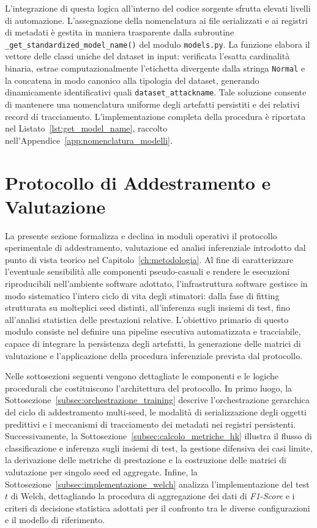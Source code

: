 L'integrazione di questa logica all'interno del codice sorgente sfrutta elevati livelli di automazione. 
L'assegnazione della nomenclatura ai file serializzati e ai registri di metadati è gestita in maniera trasparente dalla subroutine \texttt{\_get\_standardized\_model\_name()} del modulo \texttt{models.py}. 
La funzione elabora il vettore delle classi uniche del dataset in input: verificata l'esatta cardinalità binaria, estrae computazionalmente l'etichetta divergente dalla stringa \texttt{Normal} e la concatena in modo canonico alla tipologia del dataset, generando dinamicamente identificativi quali \texttt{dataset\_attackname}. 
Tale soluzione consente di mantenere una nomenclatura uniforme degli artefatti persistiti e dei relativi record di tracciamento. 
L'implementazione completa della procedura è riportata nel Listato~\ref{lst:get_model_name}, raccolto nell'Appendice~\ref{app:nomenclatura_modelli}.


\section{Protocollo di Addestramento e Valutazione}
\label{sec:protocollo_addestramento_valutazione}

La presente sezione formalizza e declina in moduli operativi il protocollo sperimentale di addestramento, valutazione ed analisi inferenziale introdotto dal punto di vista teorico nel Capitolo~\ref{ch:metodologia}.
Al fine di caratterizzare l'eventuale sensibilità alle componenti pseudo-casuali e rendere le esecuzioni riproducibili nell'ambiente software adottato, l'infrastruttura software gestisce in modo sistematico l'intero ciclo di vita degli stimatori: dalla fase di fitting strutturata su molteplici seed distinti, all'inferenza sugli insiemi di test, fino all'analisi statistica delle prestazioni relative.
L'obiettivo primario di questo modulo consiste nel definire una pipeline esecutiva automatizzata e tracciabile, capace di integrare la persistenza degli artefatti, la generazione delle matrici di valutazione e l'applicazione della procedura inferenziale prevista dal protocollo.

Nelle sottosezioni seguenti vengono dettagliate le componenti e le logiche procedurali che costituiscono l'architettura del protocollo.
In primo luogo, la Sottosezione~\ref{subsec:orchestrazione_training} descrive l'orchestrazione gerarchica del ciclo di addestramento multi-seed, le modalità di serializzazione degli oggetti predittivi e i meccanismi di tracciamento dei metadati nei registri persistenti.
Successivamente, la Sottosezione~\ref{subsec:calcolo_metriche_hk} illustra il flusso di classificazione e inferenza sugli insiemi di test, la gestione difensiva dei casi limite, la derivazione delle metriche di prestazione e la costruzione delle matrici di valutazione per singolo seed ed aggregate.
Infine, la Sottosezione~\ref{subsec:implementazione_welch} analizza l'implementazione del test $t$ di Welch, dettagliando la procedura di aggregazione dei dati di \textit{F1-Score} e i criteri di decisione statistica adottati per il confronto tra le diverse configurazioni e il modello di riferimento.

